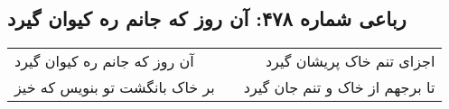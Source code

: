 \begin{center}
\section*{رباعی شماره ۴۷۸: آن روز که جانم ره کیوان گیرد}
\label{sec:0478}
\begin{longtable}{l p{0.5cm} r}
آن روز که جانم ره کیوان گیرد
&&
اجزای تنم خاک پریشان گیرد
\\
بر خاک بانگشت تو بنویس که خیز
&&
تا برجهم از خاک و تنم جان گیرد
\\
\end{longtable}
\end{center}
